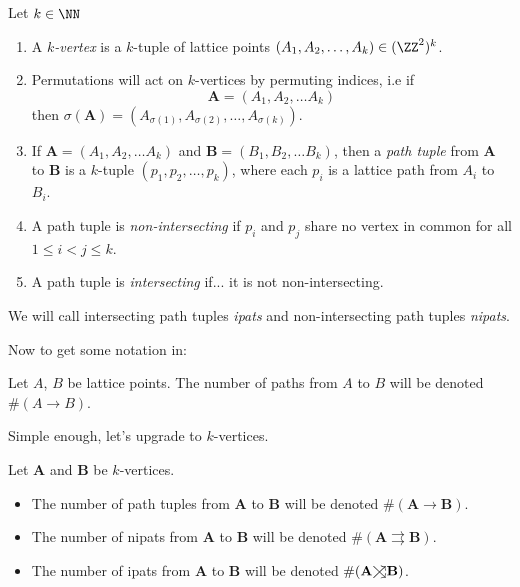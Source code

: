 \documentclass{article}
\newcommand\toea{\mathrel{\ooalign{$\nearrow$\cr$\searrow$\cr}}}
\newcommand\toto{\rightrightarrows}
\begin{document}
\begin{definition} Let $k \in \NN$
    \begin{enumerate}
        \item A \textit{$k$-vertex} is a $k$-tuple of lattice points $(A_1, A_2, \ldots, A_k) \in (\ZZ^2)^k$. 
        \item Permutations will act on $k$-vertices by permuting indices, i.e if
            \[
                \mathbf{A} = (A_1, A_2, \ldots A_k)
            \]
            then
            $\sigma(\mathbf{A}) = (A_{\sigma(1)}, A_{\sigma(2)}, \ldots, A_{\sigma(k)})$.
        \item If $\mathbf{A} = (A_1, A_2, \ldots A_k)$ and $\mathbf{B} = (B_1, B_2, \ldots B_k)$, then a \textit{path tuple} from $\mathbf{A}$ to $\mathbf{B}$ is a $k$-tuple $(p_1, p_2, \ldots, p_k)$, where each $p_i$ is a lattice path from $A_i$ to $B_i$.
        \item A path tuple is \textit{non-intersecting} if $p_i$ and $p_j$ share no vertex in common for all $1 \leq i < j \leq k$.
        \item A path tuple is \textit{intersecting} if... it is not non-intersecting.
    \end{enumerate}
\end{definition}

We will call intersecting path tuples \textit{ipats} and non-intersecting path tuples \textit{nipats}.

Now to get some notation in:

\begin{definition}
    Let $A$, $B$ be lattice points. The number of paths from $A$ to $B$ will be denoted $\#(A{\to}B)$.
\end{definition}

Simple enough, let's upgrade to $k$-vertices.

\begin{definition} Let $\mathbf{A}$ and $\mathbf{B}$ be $k$-vertices.
    \begin{itemize}
        \item The number of path tuples from $\mathbf{A}$ to $\mathbf{B}$ will be denoted $\#(\mathbf{A}{\to}\mathbf{B})$.
        \item The number of nipats from $\mathbf{A}$ to $\mathbf{B}$ will be denoted $\#(\mathbf{A}{\toto}\mathbf{B})$.
        \item The number of ipats from $\mathbf{A}$ to $\mathbf{B}$ will be denoted $\#(\mathbf{A}{\toea}\mathbf{B})$.
    \end{itemize}
\end{definition}
\end{document}
